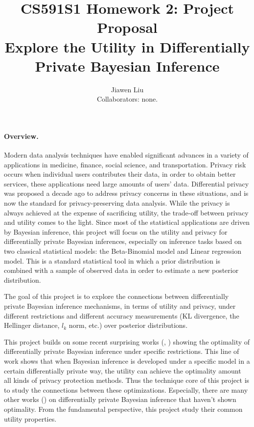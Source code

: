 \documentclass{article}
\begin{document}
\title{
{\textbf{CS591S1 Homework 2: Project Proposal}\\
\large{Explore the Utility in Differentially Private Bayesian Inference}}
}
\author{Jiawen Liu\\
Collaborators: none.}

\date{}
\maketitle

\paragraph{Overview.}
Modern data analysis techniques have enabled significant
advances in a variety of applications in medicine, finance,
social science, and transportation. Privacy risk occurs when individual users contributes their data, in order to obtain better
services, these applications need large amounts of users’ data. 
Differential privacy was proposed a decade ago to address privacy concerns in these situations, and is now the standard for privacy-preserving data analysis.
While the privacy is always achieved at the expense of sacrificing utility, the trade-off between privacy and utility comes to the light.
Since most of the statistical applications are driven by Bayesian inference, this project will focus on the utility and privacy for differentially private Bayesian inferences, especially on inference tasks based on two classical statistical models: the Beta-Binomial model and Linear regression model.
This is a standard statistical tool in which a prior distribution is combined
with a sample of observed data in order to estimate a new posterior distribution.

The goal of this project is to explore the connections between differentially private Bayesian
inference mechanisms, in terms of utility and privacy, under different restrictions and different accuracy measurements (KL divergence, the Hellinger
distance, $l_k$ norm, etc.) over posterior distributions.
%
%

This project builds on some recent surprising works (\cite{ghosh2012universally}, \cite{zhang2016differential}) showing the optimality of differentially private Bayesian inference under specific restrictions. This line of work shows that when Bayesian inference is developed under a specific model in a certain differentially private way, the utility can achieve the optimality amount all kinds of privacy protection methods.
Thus the technique core of this project is to study the connections between these optimizations. 
Especially, there are many other works (\cite{bernstein2019differentially}) on differentially private Bayesian inference that haven't shown optimality.   
From the fundamental perspective, this project study their common utility properties.
%
\end{document}
